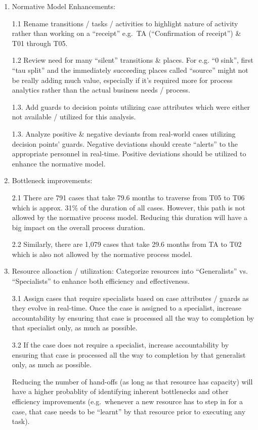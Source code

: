 \documentclass[]{article}
\begin{document}
\begin{enumerate}
\def\labelenumi{\arabic{enumi}.}
\item
  Normative Model Enhancements:

  1.1 Rename transitions / tasks / activities to highlight nature of
  activity rather than working on a ``receipt'' e.g.~TA (``Confirmation
  of receipt'') \& T01 through T05.

  1.2 Review need for many ``silent'' transitions \& places. For e.g.
  ``0 sink'', first ``tau split'' and the immediately succeeding places
  called ``source'' might not be really adding much value, especially if
  it's required more for process analytics rather than the actual
  business needs / process.

  1.3. Add guards to decision points utilizing case attributes which
  were either not available / utilized for this analysis.

  1.3. Analyze positive \& negative deviants from real-world cases
  utilizing decision points' guards. Negative deviations should create
  ``alerts'' to the appropriate personnel in real-time. Positive
  deviations should be utilized to enhance the normative model.
\item
  Bottleneck improvements:

  2.1 There are 791 cases that take 79.6 months to traverse from T05 to
  T06 which is approx. 31\% of the duration of all cases. However, this
  path is not allowed by the normative process model. Reducing this
  duration will have a big impact on the overall process duration.

  2.2 Similarly, there are 1,079 cases that take 29.6 months from TA to
  T02 which is also not allowed by the normative process model.
\item
  Resource alloaction / utilization: Categorize resources into
  ``Generalists'' vs. ``Specialists'' to enhance both efficiency and
  effectiveness.

  3.1 Assign cases that require specialists based on case attributes /
  guards as they evolve in real-time. Once the case is assigned to a
  specialist, increase accountability by ensuring that case is processed
  all the way to completion by that specialist only, as much as
  possible.

  3.2 If the case does not require a specialist, increase accountability
  by ensuring that case is processed all the way to completion by that
  generalist only, as much as possible.

  Reducing the number of hand-offs (as long as that resource has
  capacity) will have a higher probablity of identifying inherent
  bottlenecks and other efficiency improvements (e.g.~whenever a new
  resource has to step in for a case, that case needs to be ``learnt''
  by that resource prior to executing any task).
\end{enumerate}
\end{document}
